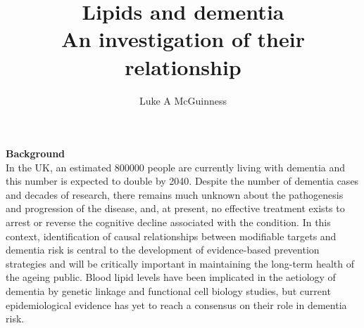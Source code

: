 \documentclass[a4paper, twoside]{templates/ociamthesis}
\title{Lipids and dementia\\
An investigation of their relationship}
\author{Luke A McGuinness}
\begin{document}
\setlength{\textbaselineskip}{22pt plus2pt}

\setlength{\frontmatterbaselineskip}{17pt plus1pt minus1pt}

\setlength{\abstractseparatelineskip}{13pt plus1pt minus1pt}
\setlength{\abstractseparateparskip}{0pt plus 1pt}

\setlength{\parskip}{2pt plus 1pt}


\setlength{\baselineskip}{\textbaselineskip}



\setcounter{secnumdepth}{2}
\setcounter{tocdepth}{2}


\begin{abstractseparate}
  \textbf{Background}\\
  In the UK, an estimated 800000 people are currently living with dementia and this number is expected to double
  by 2040. Despite the number of dementia cases and decades of research, there remains much unknown about
  the pathogenesis and progression of the disease, and, at present, no effective treatment exists to arrest or
  reverse the cognitive decline associated with the condition. In this context, identification of causal relationships
  between modifiable targets and dementia risk is central to the development of evidence-based prevention
  strategies and will be critically important in maintaining the long-term health of the ageing public. Blood lipid
  levels have been implicated in the aetiology of dementia by genetic linkage and functional cell biology studies,
  but current epidemiological evidence has yet to reach a consensus on their role in dementia risk.
\end{abstractseparate}
\end{document}
